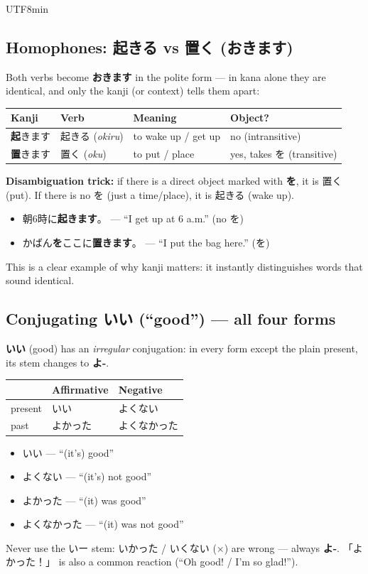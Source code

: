 \documentclass[11pt]{article}
\begin{document}
\begin{CJK}{UTF8}{min}
\subsection{Homophones: \texorpdfstring{起きる}{okiru} vs \texorpdfstring{置く}{oku} (\texorpdfstring{おきます}{okimasu})}
Both verbs become \textbf{おきます} in the polite form --- in kana alone they
are identical, and only the kanji (or context) tells them apart:
\begin{center}
\begin{tabular}{@{}llll@{}}
\toprule
Kanji & Verb & Meaning & Object? \\
\midrule
\textbf{起}きます & 起きる (\emph{okiru}) & to wake up / get up & no (intransitive) \\
\textbf{置}きます & 置く (\emph{oku})    & to put / place      & yes, takes を (transitive) \\
\bottomrule
\end{tabular}
\end{center}
\textbf{Disambiguation trick:} if there is a direct object marked with
\textbf{を}, it is 置く (put). If there is no を (just a time/place), it is
起きる (wake up).
\begin{itemize}
  \item 朝6時に\textbf{起きます}。 --- ``I get up at 6 a.m.'' (no を)
  \item かばん\textbf{を}ここに\textbf{置きます}。 --- ``I put the bag here.'' (を)
\end{itemize}
This is a clear example of why kanji matters: it instantly distinguishes words
that sound identical.

\subsection{Conjugating \texorpdfstring{いい}{ii} (``good'') --- all four forms}
\textbf{いい} (good) has an \emph{irregular} conjugation: in every form except
the plain present, its stem changes to \textbf{よ-}.
\begin{center}
\begin{tabular}{@{}lll@{}}
\toprule
 & Affirmative & Negative \\
\midrule
present & いい       & よくない \\
past    & よかった   & よくなかった \\
\bottomrule
\end{tabular}
\end{center}
\begin{itemize}
  \item いい --- ``(it's) good''
  \item よくない --- ``(it's) not good''
  \item よかった --- ``(it) was good''
  \item よくなかった --- ``(it) was not good''
\end{itemize}
Never use the いー stem: いかった / いくない ($\times$) are wrong --- always
\textbf{よ-}. 「よかった！」 is also a common reaction (``Oh good! / I'm so glad!'').


\end{CJK}
\end{document}
